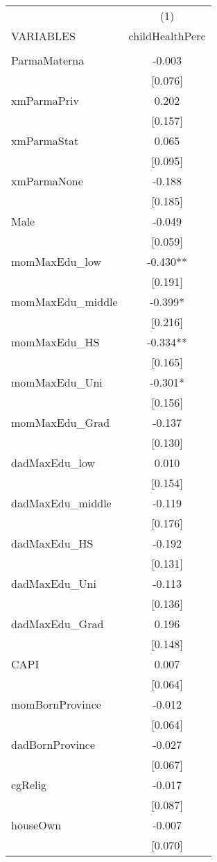 \documentclass[]{article}
\begin{document}
\begin{tabular}{lc} \hline
 & (1) \\
VARIABLES & childHealthPerc \\ \hline
 &  \\
ParmaMaterna & -0.003 \\
 & [0.076] \\
xmParmaPriv & 0.202 \\
 & [0.157] \\
xmParmaStat & 0.065 \\
 & [0.095] \\
xmParmaNone & -0.188 \\
 & [0.185] \\
Male & -0.049 \\
 & [0.059] \\
momMaxEdu\_low & -0.430** \\
 & [0.191] \\
momMaxEdu\_middle & -0.399* \\
 & [0.216] \\
momMaxEdu\_HS & -0.334** \\
 & [0.165] \\
momMaxEdu\_Uni & -0.301* \\
 & [0.156] \\
momMaxEdu\_Grad & -0.137 \\
 & [0.130] \\
dadMaxEdu\_low & 0.010 \\
 & [0.154] \\
dadMaxEdu\_middle & -0.119 \\
 & [0.176] \\
dadMaxEdu\_HS & -0.192 \\
 & [0.131] \\
dadMaxEdu\_Uni & -0.113 \\
 & [0.136] \\
dadMaxEdu\_Grad & 0.196 \\
 & [0.148] \\
CAPI & 0.007 \\
 & [0.064] \\
momBornProvince & -0.012 \\
 & [0.064] \\
dadBornProvince & -0.027 \\
 & [0.067] \\
cgRelig & -0.017 \\
 & [0.087] \\
houseOwn & -0.007 \\
 & [0.070] \\

\end{tabular}
\end{document}
